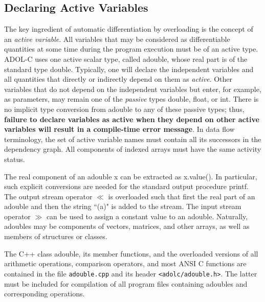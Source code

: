 \documentclass[11pt,twoside]{article}
\begin{document}
\subsection{Declaring Active Variables}
%
\label{DecActVar}
%
The key ingredient of automatic differentiation by overloading is the
concept of an {\em active variable}. All variables that may be
considered as differentiable quantities at some time
during the program execution must be of an active
type. ADOL-C uses one 
active scalar type, called {\sf adouble}, whose real part is of the
standard type {\sf double}. 
Typically, one will declare the independent variables
and all quantities that directly or indirectly depend on them as 
{\em active}. Other variables that do not depend on the independent
variables but enter, for example, as parameters, may remain one of the
{\em passive} types {\sf double, float}, or {\sf int}. There is no
implicit type conversion from {\sf adouble} to any of these passive
types; thus, {\bf failure to declare variables as active when they
depend on other active variables will result in a compile-time error
message}. In data flow terminology, the set of active variable names
must contain all its successors in the dependency graph. All components
of indexed arrays must have the same activity status.

The real component of an {\sf adouble x} can be extracted as
{\sf x.value()}. In particular,
such explicit conversions are needed for the standard output procedure
{\sf printf}. The output stream operator \boldmath $\ll$ \unboldmath is overloaded such
that first the real part of an {\sf adouble} and then the string
``{\sf (a)}" is added to the stream. The input stream operator \boldmath $\gg$ \unboldmath  can
be used to assign a constant value to an {\sf adouble}.
Naturally, {\sf adouble}s may be
components of vectors, matrices, and other arrays, as well as
members of structures or classes. 

The C++ class {\sf adouble}, its member functions, and the overloaded
versions of all arithmetic operations, comparison operators, and 
most ANSI C functions are contained in the file \verb=adouble.cpp= and its
header \verb=<adolc/adouble.h>=. The latter must be included for compilation
of all program files containing {\sf adouble}s and corresponding 
operations. 
%
\end{document}
